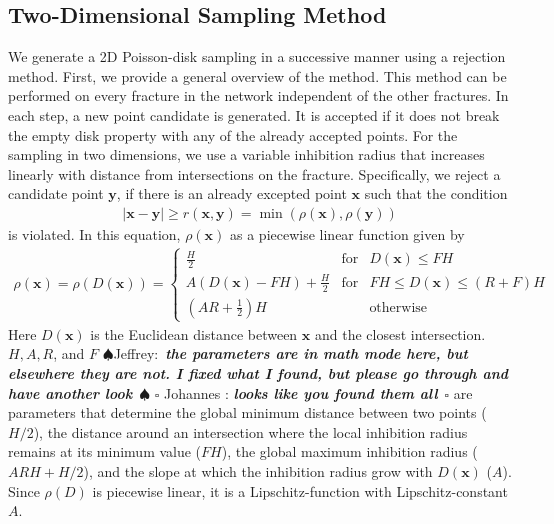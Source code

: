 \documentclass[preprint, 10pt]{elsarticle}
\newcommand{\vx}{{\mathbf x}}
\newcommand{\vy}{{\mathbf y}}
\newif\ifnotesw \noteswtrue
\newcommand{\jeffrey}[1]{\ifnotesw  \textcolor[rgb]{0,0,1}{  $\spadesuit$Jeffrey:\ {\sf \bf \it #1}\ $\spadesuit$ }\fi}
\newcommand{\johannes}[1]{\ifnotesw  \textcolor[rgb]{1,0,1}{ $\square$ Johannes : {\sf \bf \it #1}\ $\square$ }\fi}
\theoremstyle{definition}
\theoremstyle{remark}
\begin{document}
\subsection{Two-Dimensional Sampling Method}
We generate a 2D Poisson-disk sampling in a successive manner using a rejection method.
First, we provide a general overview of the method.
This method can be performed on every fracture in the network independent of the other fractures. 
In each step, a new point candidate is generated.
It is accepted if it does not break the empty disk property with any of the already accepted points. 
For the sampling in two dimensions, we use a variable inhibition radius that increases linearly with distance from intersections on the fracture. 
Specifically, we reject a candidate point $\vy$, if there is an already excepted point $\vx$ such that the condition 
\begin{align}
|\vx-\vy|\ge r(\vx,\vy) = \min(\rho(\vx),\rho(\vy)) \label{eq:empty_disk}
\end{align}
is violated.
In this equation, $\rho(\vx)$ as a piecewise linear function given by
\begin{align}
\rho(\vx)=\rho(D(\vx))=\left\{\begin{matrix}
\frac{H}{2} &\text{for} & D(\vx)\le FH\\
A(D(\vx)-FH)+\frac{H}{2} &\text{for}& FH\le D(\vx) \le (R+F)H \\
 (AR+\frac{1}{2})H & & \text{otherwise}
\end{matrix}\right .\label{eq:rho2d}
\end{align}
Here $D(\vx)$ is the Euclidean distance between $\vx$ and the closest intersection. 
$H, A, R$, and $F$ \jeffrey{the parameters are in math mode here, but elsewhere they are not. I fixed what I found, but please go through and have another look}\johannes{looks like you found them all} are parameters that determine the global minimum distance between two points ($H/2$), the distance around an intersection where the local inhibition radius remains at its minimum value ($FH$), the global maximum inhibition radius ($ARH+H/2$), and the slope at which the inhibition radius grow with $D(\vx)$ ($A$).
Since $\rho(D)$ is piecewise linear, it is a Lipschitz-function with Lipschitz-constant $A$.
\end{document}
